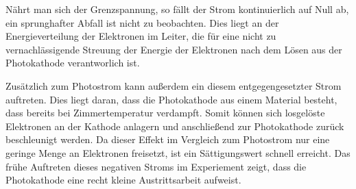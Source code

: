 Nährt man sich der Grenzspannung, so fällt der Strom kontinuierlich auf Null ab, ein sprunghafter Abfall ist
nicht zu beobachten.
Dies liegt an der Energieverteilung der Elektronen im Leiter, die für eine nicht zu vernachlässigende Streuung
der Energie der Elektronen nach dem Lösen aus der Photokathode verantworlich ist.

Zusätzlich zum Photostrom kann außerdem ein diesem entgegengesetzter Strom auftreten. Dies liegt daran,
dass die Photokathode aus einem Material besteht, dass bereits bei Zimmertemperatur verdampft.
Somit können sich losgelöste Elektronen an der Kathode anlagern und anschließend zur Photokathode zurück beschleunigt werden.
Da dieser Effekt im Vergleich zum Photostrom nur eine geringe Menge an Elektronen freisetzt, ist
ein Sättigungswert schnell erreicht.
Das frühe Auftreten dieses negativen Stroms im Experiement zeigt, dass die Photokathode eine recht kleine
Austrittsarbeit aufweist.